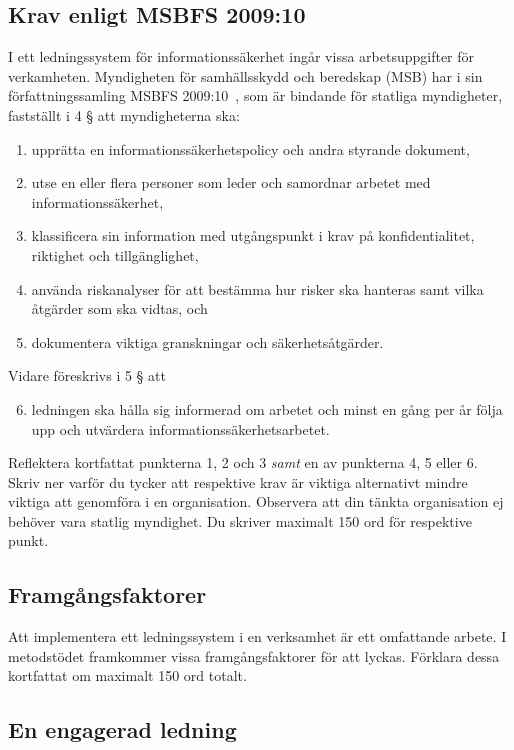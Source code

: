 \documentclass[a4paper]{llncs}
\begin{document}
\subsection{Krav enligt MSBFS 2009:10}

I ett ledningssystem för informationssäkerhet ingår vissa arbetsuppgifter för 
verkamheten.
Myndigheten för samhällsskydd och beredskap (MSB) har i sin författningssamling 
MSBFS 2009:10~\cite{MSBFS2009:10}, som är bindande för statliga myndigheter, 
fastställt i 4 § att myndigheterna ska:
\begin{enumerate}
  \item upprätta en informationssäkerhetspolicy och andra styrande dokument,
  \item utse en eller flera personer som leder och samordnar arbetet med 
    informationssäkerhet,
  \item klassificera sin information med utgångspunkt i krav på 
    konfidentialitet, riktighet och tillgänglighet,
  \item använda riskanalyser för att bestämma hur risker ska hanteras samt 
    vilka åtgärder som ska vidtas, och
  \item dokumentera viktiga granskningar och säkerhetsåtgärder.
\end{enumerate}
Vidare föreskrivs i 5 § att
\begin{enumerate}\setcounter{enumi}{5}
  \item ledningen ska hålla sig informerad om arbetet och minst en gång per år 
    följa upp och utvärdera informationssäkerhetsarbetet.
\end{enumerate}

Reflektera kortfattat punkterna 1, 2 och 3 \emph{samt} en av punkterna 4, 
5 eller 6.
Skriv ner varför du tycker att respektive krav är viktiga alternativt mindre 
viktiga att genomföra i en organisation.
Observera att din tänkta organisation ej behöver vara statlig myndighet.
Du skriver maximalt 150 ord för respektive punkt.

\subsection{Framgångsfaktorer}

Att implementera ett ledningssystem i en verksamhet är ett omfattande arbete.
I metodstödet framkommer vissa framgångsfaktorer för att lyckas.
Förklara dessa kortfattat om maximalt 150 ord totalt.

\subsection{En engagerad ledning}
\end{document}
